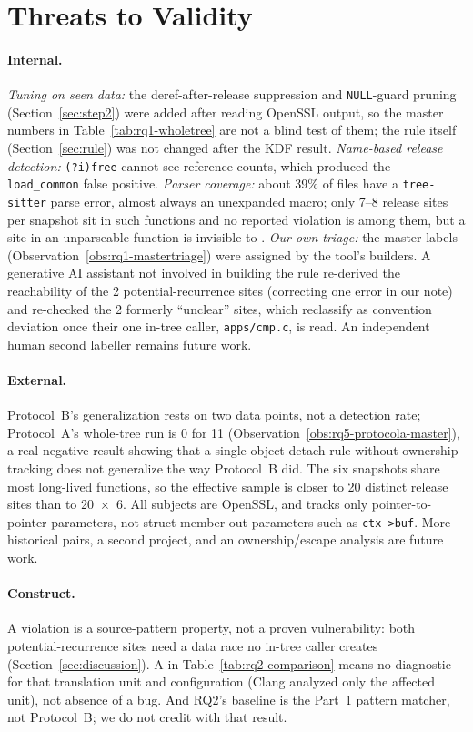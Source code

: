 \section{Threats to Validity}
\label{sec:threats}

\paragraph{Internal.} \emph{Tuning on seen data:} the deref-after-release
suppression and \texttt{NULL}-guard pruning (Section~\ref{sec:step2}) were
added after reading OpenSSL output, so the master numbers in
Table~\ref{tab:rq1-wholetree} are not a blind test of them; the rule itself
(Section~\ref{sec:rule}) was not changed after the KDF result.
\emph{Name-based release detection:} \texttt{(?i)free} cannot see reference
counts, which produced the \texttt{load\_common} false positive.
\emph{Parser coverage:} about 39\% of files have a \texttt{tree-sitter}
parse error, almost always an unexpanded macro; only 7--8 release sites per
snapshot sit in such functions and no reported violation is among them, but
a site in an unparseable function is invisible to \tool. \emph{Our own
triage:} the master labels (Observation~\ref{obs:rq1-mastertriage}) were
assigned by the tool's builders. A generative AI assistant not involved in
building the rule re-derived the reachability of the 2 potential-recurrence
sites (correcting one error in our note) and re-checked the 2 formerly
``unclear'' sites, which reclassify as convention deviation once their one
in-tree caller, \texttt{apps/cmp.c}, is read. An independent human second
labeller remains future work.

\paragraph{External.} Protocol~B's generalization rests on two data points,
not a detection rate; Protocol~A's whole-tree run is 0 for 11
(Observation~\ref{obs:rq5-protocola-master}), a real negative result showing
that a single-object detach rule without ownership tracking does not
generalize the way Protocol~B did. The six snapshots share most long-lived
functions, so the effective sample is closer to 20 distinct release sites
than to 20~$\times$~6. All subjects are OpenSSL, and \tool tracks only
pointer-to-pointer parameters, not struct-member out-parameters such as
\texttt{ctx->buf}. More historical pairs, a second project, and an
ownership/escape analysis are future work.

\paragraph{Construct.} A violation is a source-pattern property, not a
proven vulnerability: both potential-recurrence sites need a data race no
in-tree caller creates (Section~\ref{sec:discussion}). A \xmark{} in
Table~\ref{tab:rq2-comparison} means no diagnostic for that translation
unit and configuration (Clang analyzed only the affected unit), not absence
of a bug. And RQ2's baseline is the Part~1 pattern matcher, not
Protocol~B; we do not credit \tool with that result.
